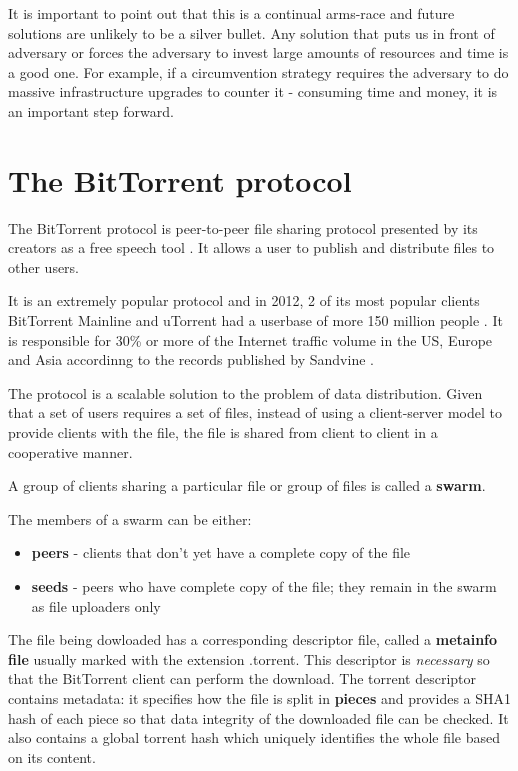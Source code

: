 \documentclass[11pt]{book} %
\begin{document}
It is important to point out  that this is a continual arms-race and future solutions are unlikely to be a silver bullet. Any solution that puts us in front of adversary or forces the adversary to invest large amounts of resources and time is a good one. For example, if a circumvention strategy requires the adversary to do massive infrastructure upgrades to counter it - consuming time and money, it is an important step forward.

\section{The BitTorrent protocol}

The BitTorrent protocol is peer-to-peer file sharing protocol presented by its creators as a free speech tool \citep*{web:btIntro}. It allows a user to publish and distribute files to other users.

It is an extremely popular protocol and in 2012, 2 of its most popular clients BitTorrent Mainline and uTorrent had a userbase of more 150 million people  \citep*{web:btOrgUsers}. It is responsible for 30\% or more of the Internet traffic volume in the US, Europe and Asia accordinng to the records published by Sandvine \citep*{sandvineInternet}.

The protocol \citep*{btProtocol} is a scalable solution to the problem of data distribution. Given that a set of users requires a set of files, instead of using a client-server model to provide clients with the file, the file is shared from client to client in a cooperative manner.

A group of clients sharing a particular file or group of files is called a \textbf{swarm}. 

The members of a swarm can be either:
\begin{itemize}
\item \textbf{peers} - clients that don't yet have a complete copy of the file
\item \textbf{seeds} - peers who have complete copy of the file; they remain in the swarm as file uploaders only
\end{itemize}

The file being dowloaded has a corresponding descriptor file, called a \textbf{metainfo file} usually marked with the extension .torrent. This descriptor is \textit{necessary} so that the BitTorrent client can perform the download. The torrent descriptor contains metadata: it specifies how the file is split in \textbf{pieces} and provides a SHA1 hash of each piece so that data integrity of the downloaded file can be checked. It also contains a global torrent hash which uniquely identifies the whole file based on its content.
\end{document}
